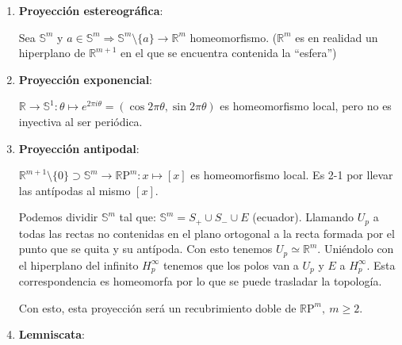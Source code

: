 \begin{ej}[¡Importantes!]
\begin{enumerate}
    \item \textbf{Proyección estereográfica}:

    Sea $\mathbb{S}^m$ y $a \in \mathbb{S}^m \Rightarrow \mathbb{S}^{m} \setminus \{a\} \rightarrow \mathbb{R}^m$ homeomorfismo. ($\mathbb{R}^{m}$ es en realidad un hiperplano de $\mathbb{R}^{m+1}$ en el que se encuentra contenida la ``esfera'')

    \item \textbf{Proyección exponencial}: 

    $\mathbb{R} \rightarrow \mathbb{S}^1: \theta \mapsto e^{2\pi i\theta} = \left( \cos 2\pi \theta, \sin 2\pi \theta \right)$ es homeomorfismo local, pero no es inyectiva al ser periódica.

    \item \textbf{Proyección antipodal}:

    $\mathbb{R}^{m+1}\setminus \{0\} \supset \mathbb{S}^m \rightarrow \mathbb{R}\mathrm{P}^{m}: x \mapsto \left[ x \right]$ es homeomorfismo local. Es 2-1 por llevar las antípodas al mismo $\left[ x \right]$. 

    Podemos dividir $\mathbb{S}^{m}$ tal que: $\mathbb{S}^{m} = S_{+} \cup S_{-} \cup E$ (ecuador). Llamando $U_p$ a todas las rectas no contenidas en el plano ortogonal a la recta formada por el punto que se quita y su antípoda. Con esto tenemos $U_p \simeq \mathbb{R}^{m}$. Uniéndolo con el hiperplano del infinito $H_p^{\infty}$ tenemos que los polos van a $U_p$ y $E$ a $H_p^{\infty}$. Esta correspondencia es homeomorfa por lo que se puede trasladar la topología.

    Con esto, esta proyección será un recubrimiento doble de $\mathbb{R}\mathrm{P}^m,\ m \ge 2$.

    \item \textbf{Lemniscata}:


\end{enumerate}
\end{ej}
